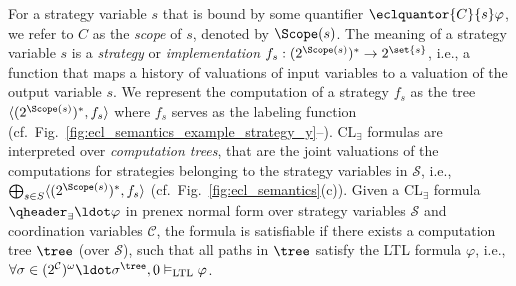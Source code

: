 \documentclass{LMCS}
\theoremstyle{plain}\newtheorem{theorem}[thm]{Theorem}
\theoremstyle{plain}\newtheorem{lemma}[thm]{Lemma}
\theoremstyle{plain}\newtheorem{proposition}[thm]{Proposition}
\theoremstyle{plain}\newtheorem{corollary}[thm]{Corollary}
\theoremstyle{definition}\newtheorem{definition}{Definition}[section]
\begin{document}
For a strategy variable $s$ that is bound by some quantifier $\eclquantor{C}{s} \varphi$, we refer to $C$ as the \emph{scope} of $s$, denoted by $\Scope(s)$.
The meaning of a strategy variable $s$ is a \emph{strategy} or \emph{implementation} $f_s : (2^{\Scope(s)})^* \rightarrow 2^\set{s}$, i.e., a function that maps a history of valuations of input variables to a valuation of the output variable $s$.
We represent the computation of a strategy $f_s$ as the tree $\langle (2^{\Scope(s)})^*,f_s \rangle$ where $f_s$ serves as the labeling function (cf.~Fig.~\ref{fig:ecl_semantics_example_strategy_y}--).
CL$_\exists$ formulas are interpreted over \emph{computation trees}, that are the joint valuations of the computations for strategies belonging to the strategy variables in $\mathcal{S}$, i.e., $\bigoplus_{s \in S} \langle (2^{\Scope(s)})^*, f_s \rangle$ (cf.~Fig.~\ref{fig:ecl_semantics}(c)).
Given a CL$_\exists$ formula $\qheader_\exists \ldot \varphi$ in prenex normal form over strategy variables $\mathcal{S}$ and coordination variables $\mathcal{C}$, the formula is satisfiable if there exists a computation tree $\tree$ (over $\mathcal{S}$), such that all paths in $\tree$ satisfy the LTL formula $\varphi$, i.e., $\forall \sigma \in (2^\mathcal{C})^\omega \ldot \sigma^\tree, 0 \vDash_\text{LTL} \varphi$.
\end{document}
